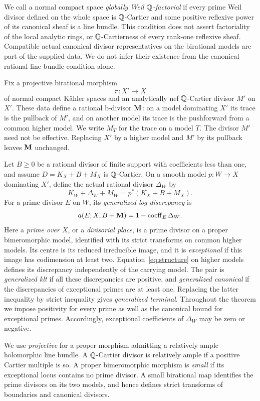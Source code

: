 We call a normal compact space \emph{globally Weil $\mathbb Q$-factorial} if
every prime Weil divisor defined on the whole space is $\mathbb Q$-Cartier
and some positive reflexive power of its canonical sheaf is a line
bundle. This condition does not assert factoriality of the local
analytic rings, or $\mathbb Q$-Cartierness of every rank-one reflexive sheaf.
Compatible actual canonical divisor representatives on the birational
models are part of the supplied data. We do not infer their existence
from the canonical rational line-bundle condition alone.

Fix a projective birational morphism
\[
 \pi:X'\longrightarrow X
\]
of normal compact K\"ahler spaces and an analytically nef
$\mathbb Q$-Cartier divisor $M'$ on $X'$. These data define a rational
b-divisor $\mathbf M$: on a model dominating $X'$ its trace is the pullback
of $M'$, and on another model its trace is the pushforward from a
common higher model. We write $M_T$ for the trace on a model $T$.
The divisor $M'$ need not be effective. Replacing $X'$ by a higher
model and $M'$ by its pullback leaves $\mathbf M$ unchanged.

Let $B\geq0$ be a rational divisor of finite support with coefficients
less than one, and assume $D=K_X+B+M_X$ is $\mathbb Q$-Cartier. On a smooth
model $p:W\to X$ dominating $X'$, define the actual rational divisor
$\Delta_W$ by
\begin{equation}\label{eq:structure}
 K_W+\Delta_W+M_W=p^*(K_X+B+M_X).
\end{equation}
For a prime divisor $E$ on $W$, its \emph{generalized log discrepancy}
is
\[
 a(E;X,B+\mathbf M)=1-\operatorname{coeff}_E\Delta_W.
\]
Here a \emph{prime over $X$}, or a \emph{divisorial place}, is a prime
divisor on a proper bimeromorphic model, identified with its strict
transforms on common higher models. Its centre is its reduced
irreducible image, and it is \emph{exceptional} if this image has
codimension at least two. Equation~\eqref{eq:structure} on higher
models defines its discrepancy independently of the carrying model.
The pair is \emph{generalized klt} if all these discrepancies are
positive, and \emph{generalized canonical} if the discrepancies of
exceptional primes are at least one. Replacing the latter inequality
by strict inequality gives \emph{generalized terminal}. Throughout
the theorem we impose positivity for every prime as well as the
canonical bound for exceptional primes. Accordingly, exceptional
coefficients of $\Delta_W$ may be zero or negative.

We use \emph{projective} for a proper morphism admitting a relatively ample
holomorphic line bundle. A $\mathbb Q$-Cartier divisor is relatively ample
if a positive Cartier multiple is so. A proper bimeromorphic
morphism is \emph{small} if its exceptional locus contains no prime
divisor. A small birational map identifies the prime divisors on its
two models, and hence defines strict transforms of boundaries and
canonical divisors.

